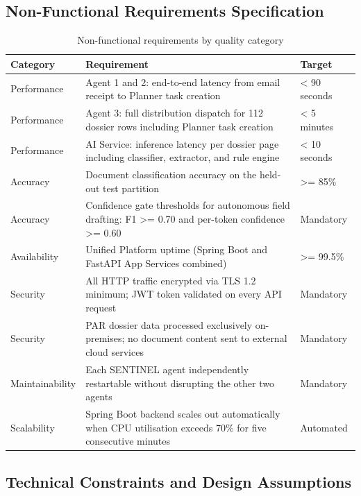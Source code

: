 \subsection{Non-Functional Requirements Specification}

\begin{table}[H]
  \centering
  \caption{Non-functional requirements by quality category}
  \renewcommand{\arraystretch}{1.0}
  \begin{tabularx}{\textwidth}{|X|X|X|}
    \hline
    \textbf{Category} & \textbf{Requirement} & \textbf{Target} \\ \hline
    Performance & Agent 1 and 2: end-to-end latency from email receipt to Planner task creation & \textless{} 90 seconds \\ \hline
    Performance & Agent 3: full distribution dispatch for 112 dossier rows including Planner task creation & \textless{} 5 minutes \\ \hline
    Performance & AI Service: inference latency per dossier page including classifier, extractor, and rule engine & \textless{} 10 seconds \\ \hline
    Accuracy & Document classification accuracy on the held-out test partition & \textgreater{}= 85\% \\ \hline
    Accuracy & Confidence gate thresholds for autonomous field drafting: F1 \textgreater{}= 0.70 and per-token confidence \textgreater{}= 0.60 & Mandatory \\ \hline
    Availability & Unified Platform uptime (Spring Boot and FastAPI App Services combined) & \textgreater{}= 99.5\% \\ \hline
    Security & All HTTP traffic encrypted via TLS 1.2 minimum; JWT token validated on every API request & Mandatory \\ \hline
    Security & PAR dossier data processed exclusively on-premises; no document content sent to external cloud services & Mandatory \\ \hline
    Maintainability & Each SENTINEL agent independently restartable without disrupting the other two agents & Mandatory \\ \hline
    Scalability & Spring Boot backend scales out automatically when CPU utilisation exceeds 70\% for five consecutive minutes & Automated \\ \hline
  \end{tabularx}
\end{table}

\subsection{Technical Constraints and Design Assumptions}

